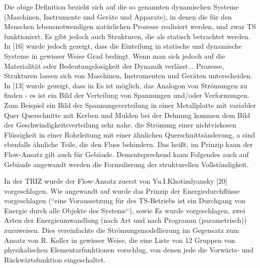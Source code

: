 \documentclass[11pt,a4paper]{article}
\begin{document}
Die obige Definition bezieht sich auf die so genannten dynamischen Systeme
(Maschinen, Instrumente und Geräte und Apparate), in denen die für den
Menschen lebensnotwendigen natürlichen Prozesse realisiert werden, und zwar TS
funktioniert. Es gibt jedoch auch Strukturen, die als statisch betrachtet
werden.  In [16] wurde jedoch gezeigt, dass die Einteilung in statische und
dynamische Systeme in gewisser Weise Grad bedingt. Wenn man sich jedoch auf
die Materialität oder Bedeutungslosigkeit der Dynamik verlässt...  Prozesse,
Strukturen lassen sich von Maschinen, Instrumenten und Geräten unterscheiden.
In [13] wurde gezeigt, dass in Es ist möglich, das Analogon von Strömungen zu
finden - es ist ein Bild der Verteilung von Spannungen und/oder Verformungen.
Zum Beispiel ein Bild der Spannungsverteilung in einer Metallplatte mit
variabler Quer Querschnitte mit Kerben und Mulden bei der Dehnung kommen dem
Bild der Geschwindigkeitsverteilung sehr nahe.  die Strömung einer
nichtviskosen Flüssigkeit in einer Rohrleitung mit einer ähnlichen
Querschnittsänderung, a sind ebenfalls ähnliche Teile, die den Fluss
behindern. Das heißt, im Prinzip kann der Flow-Ansatz gilt auch für
Gebäude. Dementsprechend kann Folgendes auch auf Gebäude angewandt werden die
Formulierung der strukturellen Vollständigkeit.

\begin{emph}
  In der TRIZ wurde der Flow-Ansatz zuerst von Yu.I.Khotimlyansky [20]
  vorgeschlagen. Wie angewandt auf wurde das Prinzip der Energiedurchflüsse
  vorgeschlagen (“eine Voraussetzung für des TS-Betriebs ist ein Durchgang von
  Energie durch alle Objekte des Systems“), sowie Es wurde vorgeschlagen, zwei
  Arten der Energieumwandlung (nach Art und nach Programm (parametrisch))
  zuzuweisen.  Dies vereinfachte die Strömungsmodellierung im Gegensatz zum
  Ansatz von R. Koller in gewisser Weise, die eine Liste von 12 Gruppen von
  physikalischen Elementarfunktionen vorschlug, von denen jede die Vorwärts-
  und Rückwärtsfunktion eingeschaltet.
\end{emph}
\end{document}
